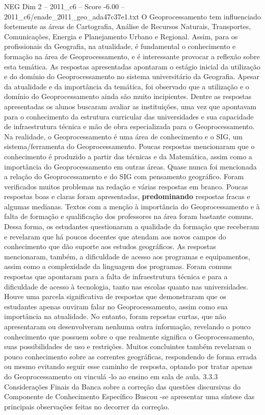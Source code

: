 \begin{textsample}{NEG Dim 2 – 2011\_c6 – Score -6.00 – 2011\_c6/enade\_2011\_geo\_ada47c37e1.txt}
O Geoprocessamento tem influenciado fortemente as áreas de Cartografia, Análise de Recursos Naturais, Transportes, Comunicações, Energia e Planejamento Urbano e Regional.
Assim, para os profissionais da Geografia, na atualidade, é fundamental o conhecimento e formação na área de Geoprocessamento, e é interessante provocar a reflexão sobre esta temática.
As respostas apresentadas apontaram o estágio inicial da utilização e do domínio do Geoprocessamento no sistema universitário da Geografia.
Apesar da atualidade e da importância da temática, foi observado que a utilização e o domínio do Geoprocessamento ainda são muito incipientes.
Dentre as respostas apresentadas os alunos buscaram avaliar as instituições, uma vez que apontavam para o conhecimento da estrutura curricular das universidades e sua capacidade de infraestrutura técnica e mão de obra especializada para o Geoprocessamento.
Na realidade, o Geoprocessamento é uma área de conhecimento e o SIG, um sistema/ferramenta do Geoprocessamento.
Poucas respostas mencionaram que o conhecimento é produzido a partir das técnicas e da Matemática, assim como a importância do Geoprocessamento em outras áreas.
Quase nunca foi mencionada a relação do Geoprocessamento e do SIG com pensamento geográfico.
Foram verificados muitos problemas na redação e várias respostas em branco.
Poucas respostas boas e claras foram apresentadas, \textbf{predominando} respostas fracas e algumas medianas.
Textos com a menção à importância do Geoprocessamento e à falta de formação e qualificação dos professores na área foram bastante comuns.
Dessa forma, os estudantes questionaram a qualidade da formação que receberam e revelaram que há poucos docentes que atendam aos novos campos do conhecimento que dão suporte aos estudos geográficos.
As respostas mencionaram, também, a dificuldade de acesso aos programas e equipamentos, assim como a complexidade da linguagem dos programas.
Foram comuns respostas que apontaram para a falta de infraestrutura técnica e para a dificuldade de acesso à tecnologia, tanto nas escolas quanto nas universidades.
Houve uma parcela significativa de respostas que demonstraram que os estudantes apenas ouviram falar no Geoprocessamento, assim como sua importância na atualidade.
No entanto, foram repostas curtas, que não apresentaram ou desenvolveram nenhuma outra informação, revelando o pouco conhecimento que possuem sobre o que realmente significa o Geoprocessamento, suas possibilidades de uso e restrições.
Muitos concluintes também revelaram o pouco conhecimento sobre as correntes geográficas, respondendo de forma errada ou mesmo evitando seguir esse caminho de resposta, optando por tratar apenas do Geoprocessamento ou vinculá -lo ao ensino em sala de aula. 3.3.3 Considerações Finais da Banca sobre a correção das questões discursivas do Componente de Conhecimento Específico Buscou -se apresentar uma síntese das principais observações feitas no decorrer da correção.

\end{textsample}
